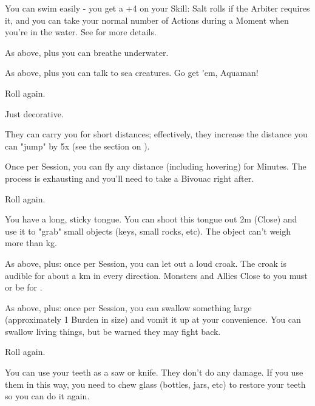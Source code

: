 \begin{multicols*}{2}
  You can swim easily - you get a +4 on your Skill: Salt rolls if the Arbiter requires it, and you can take your normal number of Actions during a Moment when you're in the water.  See  for more details.

  As above, plus you can breathe underwater.

  As above, plus you can talk to sea creatures.  Go get 'em, Aquaman!

  Roll again.

\cbreak

\NC[Name=Fly Wings]

  Just decorative.

  They can carry you for short distances; effectively, they increase the distance you can "jump" by 5x (see the section on ).

  Once per Session, you can fly any distance (including hovering) for Minutes.  The process is exhausting and you'll need to take a Bivouac right after.

 Roll again.


\NC[Name=Frog Mouth]

  You have a long, sticky tongue.  You can shoot this tongue out 2m (Close) and use it to "grab" small objects (keys, small rocks, etc).  The object can't weigh more than \OneHalf kg.

  As above, plus:  once per Session, you can let out a loud croak.  The croak is audible for about a km in every direction.  Monsters and Allies Close to you must  or be  for .

  As above, plus:  once per Session, you can swallow something large (approximately 1 Burden in size) and vomit it up at your convenience.  You can swallow living things, but be warned they may fight back.

  Roll again.


\newpage

\NC[Name=Glass Teeth]

  You can use your teeth as a saw or knife.  They don't do any damage.  If you use them in this way, you need to chew glass (bottles, jars, etc) to restore your teeth so you can do it again.


\end{multicols*}
